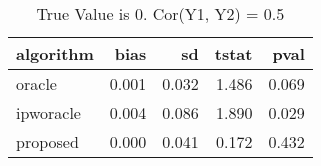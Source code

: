 \begin{table}[h!]

\caption{True Value is 0. Cor(Y1, Y2) = 0.5}
\centering
\begin{tabular}[t]{lrrrr}
\toprule
algorithm & bias & sd & tstat & pval\\
\midrule
oracle & 0.001 & 0.032 & 1.486 & 0.069\\
ipworacle & 0.004 & 0.086 & 1.890 & 0.029\\
proposed & 0.000 & 0.041 & 0.172 & 0.432\\
\bottomrule
\end{tabular}
\end{table}
